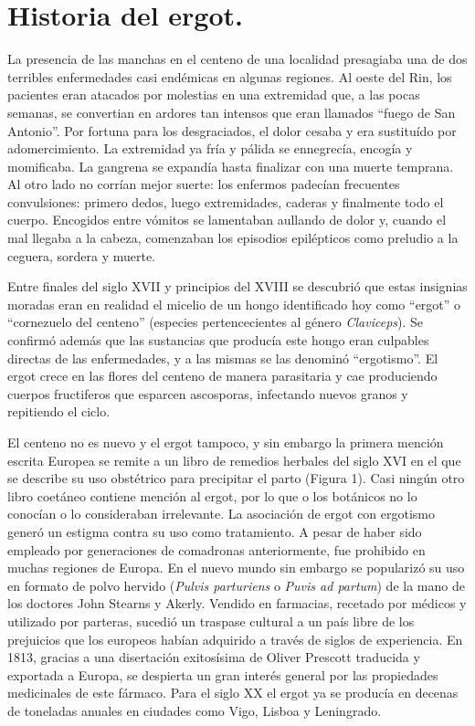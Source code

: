 \section{Historia del ergot.}

La presencia de las manchas en el centeno de una localidad presagiaba una de dos terribles enfermedades casi endémicas en algunas regiones. Al oeste del Rin, los pacientes eran atacados por molestias en una extremidad que, a las pocas semanas, se convertian en ardores tan intensos que eran llamados \enquote{fuego de San Antonio}. Por fortuna para los desgraciados, el dolor cesaba y era sustituído por adomercimiento. La extremidad ya fría y pálida se ennegrecía, encogía y momificaba. La gangrena se expandía hasta finalizar con una muerte temprana. Al otro lado no corrían mejor suerte: los enfermos padecían frecuentes convulsiones: primero dedos, luego extremidades, caderas y finalmente todo el cuerpo. Encogidos entre vómitos se lamentaban aullando de dolor y, cuando el mal llegaba a la cabeza, comenzaban los episodios epilépticos como preludio a la ceguera, sordera y muerte.

Entre finales del siglo XVII y principios del XVIII se descubrió que estas insignias moradas eran en realidad el micelio de un hongo identificado hoy como \enquote{ergot} o \enquote{cornezuelo del centeno} (especies pertencecientes al género \textit{Claviceps}). Se confirmó además que las sustancias que producía este hongo eran culpables directas de las enfermedades, y a las mismas se las denominó \enquote{ergotismo}. El ergot crece en las flores del centeno de manera parasitaria y cae produciendo cuerpos fructiferos que esparcen ascosporas, infectando nuevos granos y repitiendo el ciclo.

El centeno no es nuevo y el ergot tampoco, y sin embargo la primera mención escrita Europea se remite a un libro de remedios herbales del siglo XVI en el que se describe su uso obstétrico para precipitar el parto (Figura 1). Casi ningún otro libro coetáneo contiene mención al ergot, por lo que o los botánicos no lo conocían o lo consideraban irrelevante. La asociación de ergot con ergotismo generó un estigma contra su uso como tratamiento. A pesar de haber sido empleado por generaciones de comadronas anteriormente, fue prohibido en muchas regiones de Europa. En el nuevo mundo sin embargo se popularizó su uso en formato de polvo hervido (\textit{Pulvis parturiens} o \textit{Puvis ad partum}) de la mano de los doctores John Stearns y Akerly. Vendido en farmacias, recetado por médicos y utilizado por parteras, sucedió un traspase cultural a un país libre de los prejuicios que los europeos habían adquirido a través de siglos de experiencia. En 1813, gracias a una disertación exitosísima de Oliver Prescott traducida y exportada a Europa, se despierta un gran interés general por las propiedades medicinales de este fármaco. Para el siglo XX el ergot ya se producía en decenas de toneladas anuales en ciudades como Vigo, Lisboa y Leningrado. 

